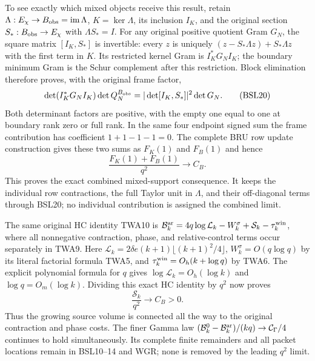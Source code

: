 \documentclass[11pt,a4paper]{article}
\begin{document}
To see exactly which mixed objects receive this result, retain
$\Lambda:E_\chi\to B_{\rm obs}=\operatorname{im}\Lambda$,
$K=\ker\Lambda$, its inclusion $I_K$, and the original section
$S_*:B_{\rm obs}\to E_\chi$ with $\Lambda S_*=I$.
For any original positive quotient Gram $G_N$, the square matrix
$[I_K,S_*]$ is invertible: every $z$ is uniquely
$(z-S_*\Lambda z)+S_*\Lambda z$ with the first term in $K$.
Its restricted kernel Gram is $I_K^*G_NI_K$; the boundary minimum
Gram is the Schur complement after this restriction. Block elimination
therefore proves, with the original frame factor,
\[
 \det(I_K^*G_NI_K)\det Q_N^{B_{\rm obs}}
       =|\det[I_K,S_*]|^2\det G_N.
 \tag{BSL20}
\]
Both determinant factors are positive, with the empty one equal to one
at boundary rank zero or full rank. In the same four endpoint signed
sum the frame contribution has coefficient $1+1-1-1=0$.
The complete BRU row update construction gives these two sums as
$F_K(1)$ and $F_B(1)$ and hence
\[
 \frac{F_K(1)+F_B(1)}{q^2}\longrightarrow C_B.
 \tag{BSL21}
\]
This proves the exact combined mixed-support consequence. It keeps
the individual row contractions, the full Taylor unit in $\Lambda$,
and their off-diagonal terms through BSL20; no individual contribution
is assigned the combined limit.

The same original HC identity TWA10 is
$\mathcal B_k^{\rm ar}=4q\log\mathcal L_k-W_k^\sigma
 +\mathcal S_k-\tau_k^{\rm win}$, where all nonnegative contraction,
phase, and relative-control terms occur separately in TWA9.
Here $\mathcal L_k=2\delta e(k+1)\lfloor(k+1)^2/4\rfloor$,
$W_k^\sigma=O(q\log q)$ by its literal factorial formula TWA5,
and $\tau_k^{\rm win}=O_h(k+\log q)$ by TWA6.
The explicit polynomial formula for $q$ gives
$\log\mathcal L_k=O_h(\log k)$ and $\log q=O_m(\log k)$.
Dividing this exact HC identity by $q^2$ now proves
\[
 \boxed{\frac{\mathcal S_k}{q^2}\longrightarrow C_B>0.}
 \tag{BSL22}
\]
Thus the growing source volume is connected all the way to the
original contraction and phase costs. The finer Gamma law
$(\mathcal B_k^0-\mathcal B_k^{\rm ar})/(kq)
 \to\mathcal C_\Gamma/4$ continues to hold simultaneously.
Its complete finite remainders and all packet locations remain
in BSL10--14 and WGR; none is removed by the leading $q^2$ limit.


\clearpage

\end{document}
